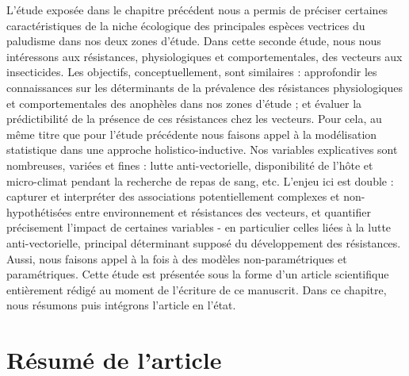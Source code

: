 \documentclass[12pt,twoside]{reedthesis}
\begin{document}
L'étude exposée dans le chapitre précédent nous a permis de préciser certaines caractéristiques de la niche écologique des principales espèces vectrices du paludisme dans nos deux zones d'étude. Dans cette seconde étude, nous nous intéressons aux résistances, physiologiques et comportementales, des vecteurs aux insecticides. Les objectifs, conceptuellement, sont similaires : approfondir les connaissances sur les déterminants de la prévalence des résistances physiologiques et comportementales des anophèles dans nos zones d'étude ; et évaluer la prédictibilité de la présence de ces résistances chez les vecteurs. Pour cela, au même titre que pour l'étude précédente nous faisons appel à la modélisation statistique dans une approche holistico-inductive. Nos variables explicatives sont nombreuses, variées et fines : lutte anti-vectorielle, disponibilité de l'hôte et micro-climat pendant la recherche de repas de sang, etc. L'enjeu ici est double : capturer et interpréter des associations potentiellement complexes et non-hypothétisées entre environnement et résistances des vecteurs, et quantifier précisement l'impact de certaines variables - en particulier celles liées à la lutte anti-vectorielle, principal déterminant supposé du développement des résistances. Aussi, nous faisons appel à la fois à des modèles non-paramétriques et paramétriques. Cette étude est présentée sous la forme d'un article scientifique entièrement rédigé au moment de l'écriture de ce manuscrit. Dans ce chapitre, nous résumons puis intégrons l'article en l'état.

\hypertarget{ruxe9sumuxe9-de-larticle}{%
\section{Résumé de l'article}\label{ruxe9sumuxe9-de-larticle}}
\end{document}

